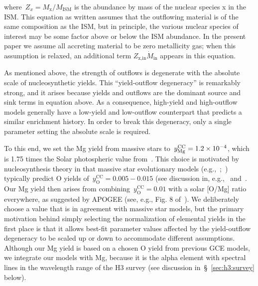 \documentclass[foo.tex]{subfiles}
\begin{document}
where~$Z_x = M_\text{x} / M_\text{ISM}$ is the abundance by mass of the nuclear
species x in the ISM.
This equation as written assumes that the outflowing material is of the same
composition as the ISM, but in principle, the various nuclear species of
interest may be some factor above or below the ISM abundance.
In the present paper we assume all accreting material to be zero metallicity
gas; when this assumption is relaxed, an additional term
$Z_\text{x,in}\dot{M}_\text{in}$ appears in this equation.
\par
As mentioned above, the strength of outflows is degenerate with the absolute
scale of nucleosynthetic yields.
This ``yield-outflow degeneracy'' is remarkably strong, and it arises because
yields and outflows are the dominant source and sink terms in equation
 above.
As a consequence, high-yield and high-outflow models generally have a
low-yield and low-outflow counterpart that predicts a similar enrichment
history.
In order to break this degeneracy, only a single parameter setting the absolute
scale is required.
\par
{\color{red}
To this end, we set the Mg yield from massive stars
to~$y_\text{Mg}^\text{CC} = 1.2\times10^{-4}$, which is 1.75 times the Solar
photospheric value from~\citet{Asplund2009}.
This choice is motivated by nucleosynthesis theory in that massive star
evolutionary models (e.g.,~\citealp*{Nomoto2013};~\citealp{Sukhbold2016,
Limongi2018}) typically predict O yields of~$y_\text{O}^\text{CC} = 0.005 -
0.015$ (see discussion in, e.g.,~\citealp{Weinberg2017b}
and~\citealp{Johnson2020}.
Our Mg yield then arises from combining~$y_\text{O}^\text{CC} = 0.01$ with a
solar [O/Mg] ratio everywhere, as suggested by APOGEE (see, e.g., Fig. 8
of~\citealp{Weinberg2019}).
We deliberately choose a value that is in agreement with massive star models,
but the primary motivation behind simply selecting the normalization of
elemental yields in the first place is that it allows best-fit parameter values
affected by the yield-outflow degeneracy to be scaled up or down to accommodate
different assumptions.
Although our Mg yield is based on a chosen O yield from previous GCE models,
we integrate our models with Mg, because it is the alpha element with spectral
lines in the wavelength range of the H3 survey (see discussion
in~\S~\ref{sec:h3:survey} below).
}
\end{document}
